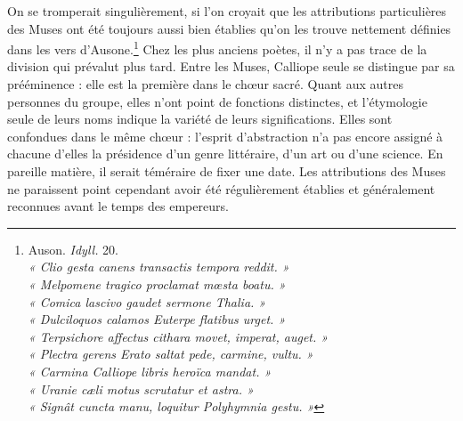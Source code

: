 \documentclass[landscape, a4paper, 11pt, oneside, polutonikogreek, french]{article}
\begin{document}
On se tromperait singulièrement, si l'on croyait que les attributions particulières des Muses ont été toujours aussi bien établies qu'on les trouve nettement définies dans les vers d'Ausone.\footnote{Auson. \emph{Idyll.} 20.\\\hspace*{5mm}\emph{« Clio gesta canens transactis tempora reddit. »}\\\hspace*{5mm}\emph{« Melpomene tragico proclamat mœsta boatu. »}\\\hspace*{5mm}\emph{« Comica lascivo gaudet sermone Thalia. »}\\\hspace*{5mm}\emph{« Dulciloquos calamos Euterpe flatibus urget. »}\\\hspace*{5mm}\emph{« Terpsichore affectus cithara movet, imperat, auget. »}\\\hspace*{5mm}\emph{« Plectra gerens Erato saltat pede, carmine, vultu. »}\\\hspace*{5mm}\emph{« Carmina Calliope libris heroïca mandat. »}\\\hspace*{5mm}\emph{« Uranie cæli motus scrutatur et astra. »}\\\hspace*{5mm}\emph{« Signât cuncta manu, loquitur Polyhymnia gestu. »}} Chez les plus anciens poètes, il n'y a pas trace de la division qui prévalut plus tard. Entre les Muses, Calliope seule se distingue par sa prééminence : elle est la première dans le chœur sacré. Quant aux autres personnes du groupe, elles n'ont point de fonctions distinctes, et l'étymologie seule de leurs noms indique la variété de leurs significations. Elles sont confondues dans le même chœur : l'esprit d'abstraction n'a pas encore assigné à chacune d'elles la présidence d'un genre littéraire, d'un art ou d'une science. En pareille matière, il serait téméraire de fixer une date. Les attributions des Muses ne paraissent point cependant avoir été régulièrement établies et généralement reconnues avant le temps des empereurs.
\end{document}
